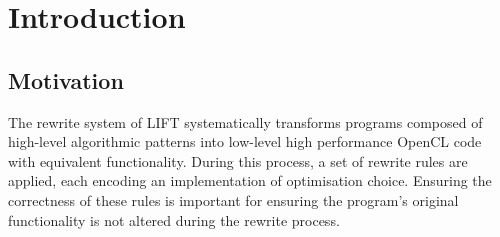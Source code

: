 \documentclass{l4proj}
\begin{document}
\tableofcontents

%
%
%
%
%
%
%
%
\chapter{Introduction}
\label{ch:into}


\section{Motivation}
The rewrite system of LIFT systematically transforms programs composed of high-level algorithmic patterns into low-level high performance OpenCL code with equivalent functionality. During this process, a set of rewrite rules are applied, each encoding an implementation of optimisation choice. Ensuring the correctness of these rules is important for ensuring the program's original functionality is not altered during the rewrite process.
\end{document}
